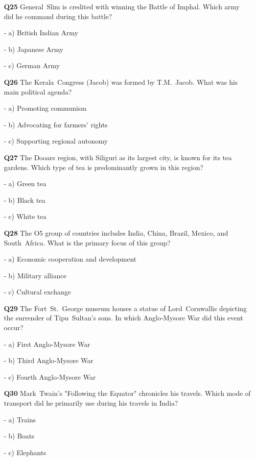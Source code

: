 \textbf{Q25} General Slim is credited with winning the Battle of Imphal. Which army did he command during this battle?\par
\quad - a) British Indian Army\par
\quad - b) Japanese Army\par
\quad - c) German Army\par

\textbf{Q26} The Kerala Congress (Jacob) was formed by T.M. Jacob. What was his main political agenda?\par
\quad - a) Promoting communism\par
\quad - b) Advocating for farmers' rights\par
\quad - c) Supporting regional autonomy\par

\textbf{Q27} The Dooars region, with Siliguri as its largest city, is known for its tea gardens. Which type of tea is predominantly grown in this region?\par
\quad - a) Green tea\par
\quad - b) Black tea\par
\quad - c) White tea\par

\textbf{Q28} The O5 group of countries includes India, China, Brazil, Mexico, and South Africa. What is the primary focus of this group?\par
\quad - a) Economic cooperation and development\par
\quad - b) Military alliance\par
\quad - c) Cultural exchange\par

\textbf{Q29} The Fort St. George museum houses a statue of Lord Cornwallis depicting the surrender of Tipu Sultan's sons. In which Anglo‑Mysore War did this event occur?\par
\quad - a) First Anglo‑Mysore War\par
\quad - b) Third Anglo‑Mysore War\par
\quad - c) Fourth Anglo‑Mysore War\par

\textbf{Q30} Mark Twain's "Following the Equator" chronicles his travels. Which mode of transport did he primarily use during his travels in India?\par
\quad - a) Trains\par
\quad - b) Boats\par
\quad - c) Elephants\par

